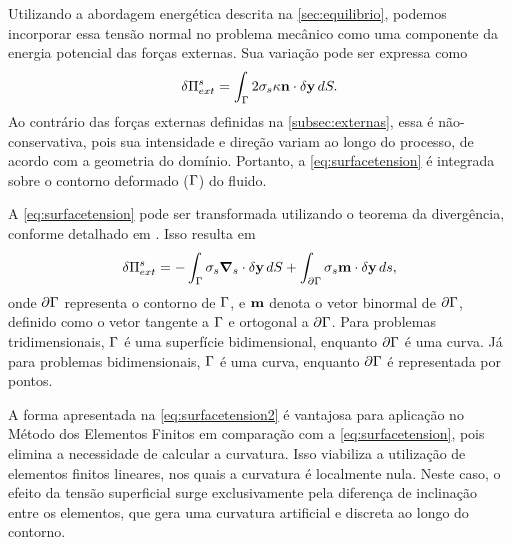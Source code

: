 \documentclass[Tese.tex]{subfiles}
\begin{document}
Utilizando a abordagem energética descrita na \cref{sec:equilibrio}, podemos incorporar essa tensão normal no problema mecânico como uma componente da energia potencial das forças externas. Sua variação pode ser expressa como
\begin{equation}\label{eq:surfacetension}
\delta{\Pi}_{ext}^{s} = \int_{\Gamma}2\sigma_s\kappa\mathbf{n} \cdot \delta\mathbf{y}\,dS.
\end{equation}
Ao contrário das forças externas definidas na \cref{subsec:externas}, essa é não-conservativa, pois sua intensidade e direção variam ao longo do processo, de acordo com a geometria do domínio. Portanto, a \cref{eq:surfacetension} é integrada sobre o contorno deformado ($\Gamma$) do fluido.

A \cref{eq:surfacetension} pode ser transformada utilizando o teorema da divergência, conforme detalhado em . Isso resulta em
\begin{equation}\label{eq:surfacetension2}
\delta{\Pi}_{ext}^{s} = -\int_{\Gamma}\sigma_s\boldsymbol{\nabla}_s\cdot \delta\mathbf{y}\,dS + \int_{\partial\Gamma}\sigma_s\mathbf{m} \cdot \delta\mathbf{y}\,ds,
\end{equation}
onde $\partial\Gamma$ representa o contorno de $\Gamma$, e $\mathbf{m}$ denota o vetor binormal de $\partial\Gamma$, definido como o vetor tangente a $\Gamma$ e ortogonal a $\partial\Gamma$. Para problemas tridimensionais, $\Gamma$ é uma superfície bidimensional, enquanto $\partial\Gamma$ é uma curva. Já para problemas bidimensionais, $\Gamma$ é uma curva, enquanto $\partial\Gamma$ é representada por pontos.

A forma apresentada na \cref{eq:surfacetension2} é vantajosa para aplicação no Método dos Elementos Finitos em comparação com a \cref{eq:surfacetension}, pois elimina a necessidade de calcular a curvatura. Isso viabiliza a utilização de elementos finitos lineares, nos quais a curvatura é localmente nula. Neste caso, o efeito da tensão superficial surge exclusivamente pela diferença de inclinação entre os elementos, que gera uma curvatura artificial e discreta ao longo do contorno.
\end{document}
